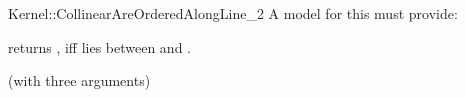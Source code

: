 \begin{ccRefFunctionObjectConcept}{Kernel::CollinearAreOrderedAlongLine_2}
A model for this must provide:


         {returns , iff  lies between  
          and . }

\ccRefines
{} (with three arguments)

\ccSeeAlso

 \\


\end{ccRefFunctionObjectConcept}
